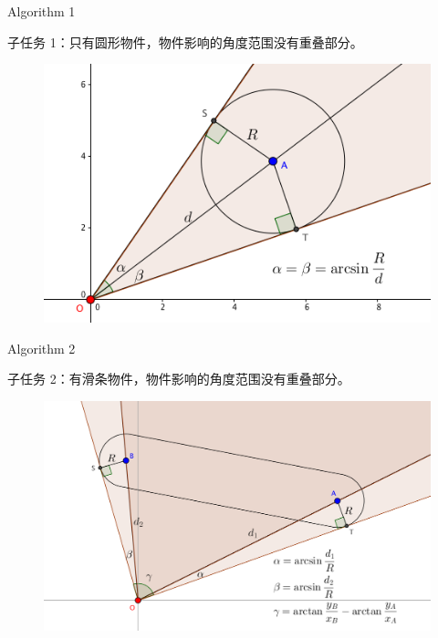 \documentclass[UTF8]{beamer}
\begin{document}
\begin{frame}{Algorithm 1}

子任务 1：只有圆形物件，物件影响的角度范围没有重叠部分。

\begin{figure}[h]\centering
\includegraphics[scale=0.48]{a1.png}
\end{figure}

\end{frame}

\begin{frame}{Algorithm 2}

子任务 2：有滑条物件，物件影响的角度范围没有重叠部分。

\begin{figure}[h]\centering
\includegraphics[scale=0.4]{a2.png}
\end{figure}

\end{frame}
\end{document}
